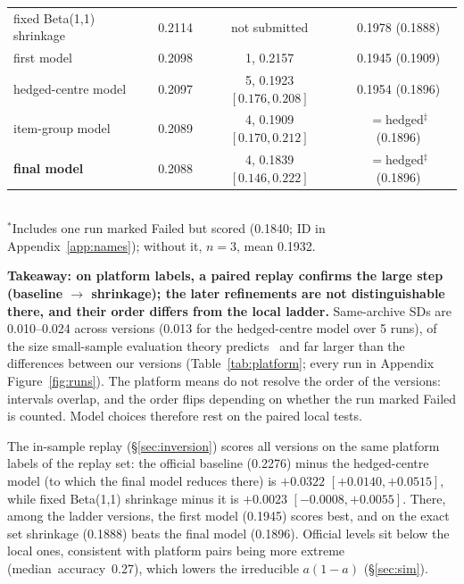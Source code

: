 \documentclass{article}
\begin{document}
\begin{table}[H]
\begin{tabular}{@{}lccc@{}}
    \midrule
    fixed Beta(1,1) shrinkage & 0.2114 & not submitted & 0.1978 (0.1888)\\
    first model             & 0.2098 & 1, 0.2157 & 0.1945 (0.1909)\\
    hedged-centre model     & 0.2097 & 5, 0.1923 $[0.176, 0.208]$ & 0.1954 (0.1896)\\
    item-group model        & 0.2089 & 4, 0.1909 $[0.170, 0.212]$\rlap{$^{\ast}$} & $={}$hedged$^{\ddagger}$ (0.1896)\\
    \textbf{final model}    & 0.2088 & 4, 0.1839 $[0.146, 0.222]$ & $={}$hedged$^{\ddagger}$ (0.1896)\\
    \bottomrule
  \end{tabular}\\[1pt]
  {\scriptsize $^{\ast}$Includes one run marked Failed but scored (0.1840; ID in Appendix~\ref{app:names}); without it,
  $n=3$, mean 0.1932.}
\end{table}
\textbf{Takeaway: on platform labels, a paired replay confirms the large step (baseline $\to$ shrinkage); the later
refinements are not distinguishable there, and their order differs from the local ladder.} Same-archive SDs
are 0.010--0.024 across versions (0.013 for the hedged-centre model over 5 runs), of the size small-sample evaluation
theory predicts~\cite{bowyer2025,miller2024} and far larger than the differences between our versions
(Table~\ref{tab:platform}; every run in Appendix Figure~\ref{fig:runs}). The platform means do not resolve the order of the versions:
intervals overlap, and the order flips depending on whether the run marked Failed is counted. Model choices therefore
rest on the paired local tests.

The in-sample replay (\S\ref{sec:inversion}) scores all versions on the same platform
labels of the replay set: the official baseline (0.2276) minus the hedged-centre model (to which the final model
reduces there) is $+0.0322$ $[+0.0140, +0.0515]$, while fixed Beta(1,1) shrinkage minus it is $+0.0023$
$[-0.0008, +0.0055]$. There, among the ladder versions, the first model (0.1945) scores best, and on the exact set
shrinkage (0.1888) beats the final model (0.1896). Official levels sit below the local ones, consistent with
platform pairs being more extreme \mbox{(median accuracy 0.27)}, which lowers the irreducible $a(1-a)$
(\S\ref{sec:sim}).
\end{document}
